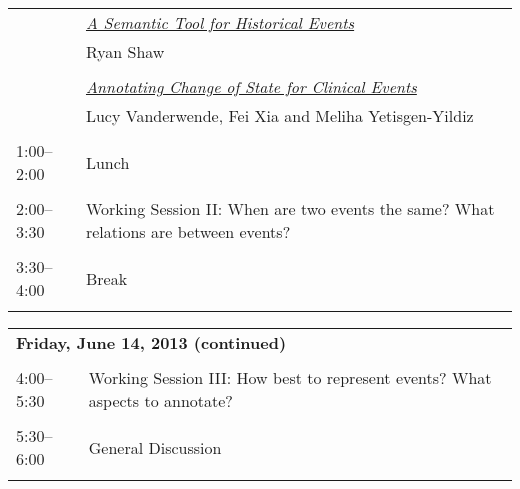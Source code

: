 \begin{tabular}{p{20mm}p{128mm}}
 & \hyperlink{page.38}{\em A Semantic Tool for Historical Events}\\
         & Ryan Shaw \\
\\

 & \hyperlink{page.47}{\em Annotating Change of State for Clinical Events}\\
         & Lucy Vanderwende, Fei Xia and Meliha Yetisgen-Yildiz \\
\\

1:00--2:00 & Lunch \\
\\
2:00--3:30 & Working Session II: When are two events the same? What relations are between events? \\
\\
3:30--4:00 & Break \\
\\
\end{tabular}
\newpage
\begin{tabular}{p{20mm}p{138mm}}
\\
\multicolumn{2}{l}{\bf Friday, June 14, 2013 (continued)} \\\\
4:00--5:30 & Working Session III: How best to represent events? What aspects to annotate? \\
\\
5:30--6:00 & General Discussion \\
\\


\end{tabular}
